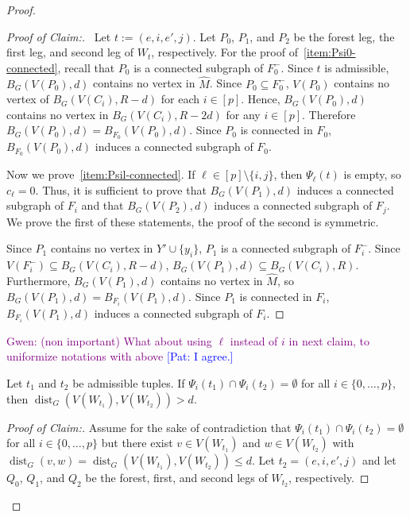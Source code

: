 \documentclass{patmorin}
\newcommand{\pat}[1]{\textcolor{Blue}{[Pat: #1]}}
\newcommand{\gwen}[1]{\textcolor{Purple}{Gwen: #1}}
\newenvironment{clmproof}{\begin{proof}[Proof of Claim:]\renewcommand{\qedsymbol}{\rule{1ex}{1ex}}}{\end{proof}}
\DeclareMathOperator{\dist}{dist}
\begin{document}
\begin{proof}
\begin{clmproof}\
    Let $t:=(e,i,e',j)$. 
    Let $P_0$, $P_1$, and $P_2$ be the forest leg, the first leg, and second leg of $W_t$, respectively.   For the proof of~\cref{item:Psi0-connected}, recall that $P_0$ is a connected subgraph of $F_0^-$. Since $t$ is admissible, $B_G(V(P_0),d)$ contains no vertex in $\widehat{M}$. Since $P_0\subseteq F_0^-$, $V(P_0)$ contains no vertex of $B_G(V(C_i),R-d)$ for each $i\in[p]$. Hence, $B_G(V(P_0),d)$ contains no vertex in $B_G(V(C_i),R-2d)$ for any $i\in[p]$. Therefore $B_G(V(P_0),d)=B_{F_0}(V(P_0),d)$.
    Since $P_0$ is connected in $F_0$, 
    $B_{F_0}(V(P_0),d)$ induces a connected subgraph of $F_0$. 
    
    Now we prove~\cref{item:Psil-connected}. If $\ell\in [p]\setminus\{i,j\}$, then $\Psi_\ell(t)$ is empty, so $c_\ell=0$.
    Thus, it is sufficient to prove that $B_G(V(P_1), d)$ induces a connected subgraph of $F_i$ and that $B_G(V(P_2),d)$ induces a connected subgraph of $F_j$.  We prove the first of these statements, the proof of the second is symmetric.
    
    Since $P_1$ contains no vertex in $Y'\cup\{y_i\}$, $P_1$ is a connected
    subgraph of $F_i^-$.  Since $V(F^-_i)\subseteq B_G(V(C_i),R-d)$, $B_G(V(P_1),d)\subseteq B_G(V(C_i),R)$.  Furthermore, $B_G(V(P_1),d)$ contains no vertex in $\widehat{M}$, so $B_G(V(P_1),d)=B_{F_i}(V(P_1),d)$. 
    Since $P_1$ is connected in $F_i$, 
    $B_{F_i}(V(P_1),d)$ induces a connected subgraph of $F_i$. 
\end{clmproof}

\gwen{(non important) What about using $\ell$ instead of $i$ in next claim, to uniformize notations with above} \pat{I agree.}

\begin{clm}\label{w_distance}
  Let $t_1$ and $t_2$ be admissible tuples.
  If $\Psi_i(t_1)\cap \Psi_i(t_2)=\emptyset$ for all $i\in\{0,\ldots,p\}$, 
  then $\dist_G(V(W_{t_1}),V(W_{t_2}))> d$.  
\end{clm}



\begin{clmproof}
  Assume for the sake of contradiction that $\Psi_i(t_1)\cap\Psi_i(t_2)=\emptyset$ for all $i\in\{0,\ldots,p\}$ but there exist $v\in V(W_{t_1})$ and $w\in V(W_{t_2})$ with $\dist_G(v,w)=\dist_G(V(W_{t_1}),V(W_{t_2})) \le d$.
  Let $t_2=(e,i,e',j)$ and let $Q_0$, $Q_1$, and $Q_2$ be the forest, first, and second legs of $W_{t_2}$, respectively.


\end{clmproof}
\end{proof}
\end{document}
